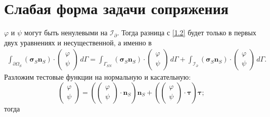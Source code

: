 \documentclass[a4paper,14pt]{extarticle}
\begin{document}
\section{Слабая форма задачи сопряжения}
$\varphi$ и $\psi$ могут быть ненулевыми на $\mathcal I_\partial$. Тогда разница с \eqref{1.2} будет только в  первых двух уравнениях и несущественной, а именно в
\begin{equation}
	\begin{gathered}
		\int_{\partial\Omega_S}
		(\boldsymbol\sigma_S\mathbf n_S)\cdot
		\begin{pmatrix}
			\varphi\\
			\psi
		\end{pmatrix}
		\,d\Gamma
		=
		\int_{\Gamma_{SN}}
		(\boldsymbol\sigma_S\mathbf n_S)\cdot
		\begin{pmatrix}
			\varphi\\
			\psi
		\end{pmatrix}
		\,d\Gamma
		+
		\int_{\mathcal I_\partial}
		(\boldsymbol\sigma_S\mathbf n_S)\cdot
		\begin{pmatrix}
			\varphi\\
			\psi
		\end{pmatrix}
		\,d\Gamma.
	\end{gathered}
	\label{eq:stokes_boundary_split}
\end{equation}
Разложим
тестовые функции на нормальную и касательную:
\begin{equation}
	\begin{pmatrix}
		\varphi\\
		\psi
	\end{pmatrix}
	=
	\left(
		\begin{pmatrix}
			\varphi\\
			\psi
		\end{pmatrix}
		\cdot\mathbf n_S
	\right)\mathbf n_S
	+
	\left(
		\begin{pmatrix}
			\varphi\\
			\psi
		\end{pmatrix}
		\cdot\boldsymbol\tau
	\right)\boldsymbol\tau;
	\label{eq:test_normal_tangent}
\end{equation}
тогда
\end{document}
